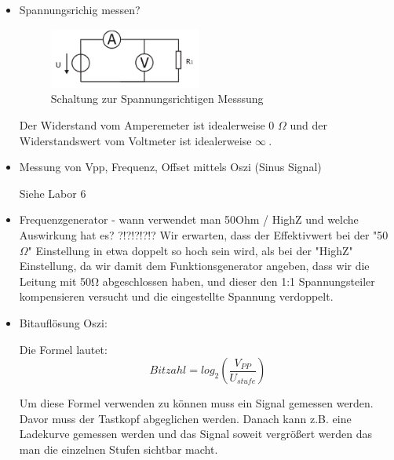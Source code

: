 \documentclass{article}
\begin{document}
\begin{itemize}
\item Spannungsrichig messen? 
\begin{figure}[h]
\centering
\includegraphics[width=5cm]{pic/urichtig}
\caption{ Schaltung zur Spannungsrichtigen Messsung }
\end{figure}

Der Widerstand vom Amperemeter ist idealerweise 0 \( \Omega \) und der Widerstandswert vom Voltmeter ist idealerweise \( \infty\ \).%
\item Messung von Vpp, Frequenz, Offset mittels Oszi (Sinus Signal)

Siehe Labor 6
\item Frequenzgenerator - wann verwendet man 50Ohm / HighZ  und welche Auswirkung hat es?
?!?!?!?!?
Wir erwarten, dass der Effektivwert bei der "50\(\Omega\)" Einstellung in etwa doppelt so hoch sein wird, als bei der "HighZ" Einstellung, da wir damit dem Funktionsgenerator angeben, dass wir die Leitung mit 50Ω abgeschlossen haben, und dieser den 1:1 Spannungsteiler kompensieren versucht und die eingestellte Spannung verdoppelt.%
\item Bitauflösung Oszi: 

Die Formel lautet: 
\begin{equation}
Bitzahl = log_2 \left( \frac{V_{PP}}{U_{stufe}} \right)
\end{equation}

Um diese Formel verwenden zu können muss ein Signal gemessen werden. Davor muss der Tastkopf abgeglichen werden. Danach kann z.B. eine Ladekurve gemessen werden und das Signal soweit vergrößert werden das man die einzelnen Stufen sichtbar macht. 


\end{itemize}
\end{document}
